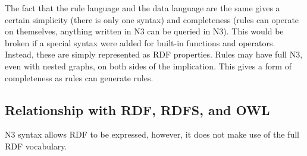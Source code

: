 \documentclass{tlp}
\begin{document}
The fact that the rule language and the data language are the same
gives a certain simplicity (there is only one syntax) and completeness
(rules can operate on themselves, anything written in N3 can be
queried in N3). This would be broken if a special syntax were added
for built-in functions and operators. Instead, these are simply
represented as RDF properties.  Rules may have full N3, even with
nested graphs, on both sides of the implication. This gives a form of
completeness as rules can generate rules.

\subsection{Relationship with RDF, RDFS, and OWL}
\label{relation}

N3 syntax allows RDF to be expressed, however, it does not make use of
the full RDF vocabulary. 
\end{document}
